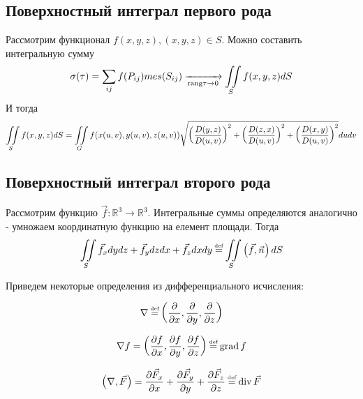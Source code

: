 \subsection{Поверхностный интеграл первого рода}

Рассмотрим функционал $f(x, y, z), (x, y, z) \in S$.
Можно составить интегральную сумму 
\begin{gather*}
	\sigma(\tau) = \sum\limits_{ij} f(P_{ij}) mes(S_{ij})
	\xrightarrow[\text{rang}\tau \rightarrow 0]{} \iint\limits_{S}f(x, y, z)dS
\end{gather*}
И тогда
\begin{gather*}
	\iint\limits_{S}f(x,y,z)dS = \iint\limits_{G}f(x(u,v), y(u,v), z(u, v))
	\sqrt{\left( \frac{D(y,z)}{D(u,v)} \right)^2 + 
	\left( \frac{D(z, x)}{D(u,v)} \right)^2 +
	\left( \frac{D(x, y)}{D(u,v)}\right)^2} dudv
\end{gather*}

\subsection{Поверхностный интеграл второго рода}

Рассмотрим функцию $\vec{f} : \mathbb{R}^3 \rightarrow \mathbb{R}^3$. Интегральные суммы определяются аналогично - умножаем координатную функцию на елемент площади. Тогда
\begin{gather*}
	\iintl{S} \vec{f}_xdydz + \vec{f}_ydzdx + \vec{f}_z dxdy \defeq 
	\iintl{S}\left( \vec{f}, \vec{n}\right)dS
\end{gather*}

Приведем некоторые определения из дифференциального исчисления:

\begin{definition}
	\begin{gather*}
		\nabla \defeq 
		\left( \pdiff{}{x}, \pdiff{}{y}, \pdiff{}{z}\right)
	\end{gather*}
\end{definition}

\begin{definition}
	\begin{gather*}
		\nabla f = \left( \pdiff{f}{x}, \pdiff{f}{y}, \pdiff{f}{z}\right)
		\defeq \grad f
	\end{gather*}
\end{definition}

\begin{definition}
	\begin{gather*}
		\left( \nabla, \vec{F}\right) = 
		\pdiff{\vec{F}_x}{x} + \pdiff{\vec{F}_y}{y} + \pdiff{\vec{F}_z}{z} \defeq \Div \vec{F}
	\end{gather*}
\end{definition}

